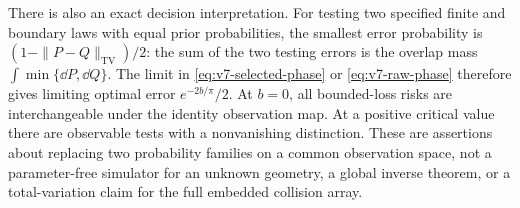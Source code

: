 There is also an exact decision interpretation. For testing two specified finite and boundary laws with equal prior probabilities, the smallest error probability is $(1-\|P-Q\|_{\mathrm{TV}})/2$: the sum of the two testing errors is the overlap mass $\int\min\{\dd P,\dd Q\}$. The limit in \eqref{eq:v7-selected-phase} or \eqref{eq:v7-raw-phase} therefore gives limiting optimal error $e^{-2b/\pi}/2$. At $b=0$, all bounded-loss risks are interchangeable under the identity observation map. At a positive critical value there are observable tests with a nonvanishing distinction. These are assertions about replacing two probability families on a common observation space, not a parameter-free simulator for an unknown geometry, a global inverse theorem, or a total-variation claim for the full embedded collision array.
